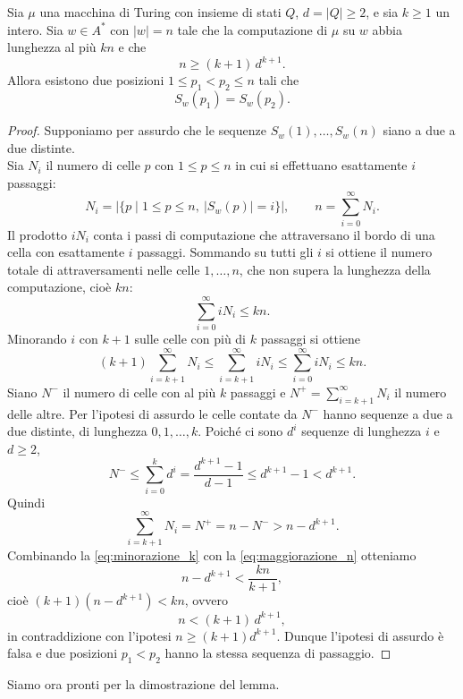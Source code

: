 \begin{lemm}\label{lemm:ripetizione}
Sia $\mu$ una macchina di Turing con insieme di stati $Q$, $d = |Q| \ge 2$, e sia $k \ge 1$ un intero. Sia $w \in A^*$ con $|w| = n$ tale che la computazione di $\mu$ su $w$ abbia lunghezza al più $kn$ e che
\[
n \ge (k+1)\,d^{k+1}.
\]
Allora esistono due posizioni $1 \le p_1 < p_2 \le n$ tali che
\[
S_w(p_1) = S_w(p_2).
\]
\begin{proof}
Supponiamo per assurdo che le sequenze $S_w(1), \dots, S_w(n)$ siano a due a due distinte.
\\
Sia $N_i$ il numero di celle $p$ con $1 \le p \le n$ in cui si effettuano esattamente $i$ passaggi:
\[
N_i = |\{p \mid 1 \le p \le n,\ |S_w(p)| = i\}|,
\qquad n = \sum_{i=0}^{\infty} N_i.
\]
Il prodotto $iN_i$ conta i passi di computazione che attraversano il bordo di una cella con esattamente $i$ passaggi. Sommando su tutti gli $i$ si ottiene il numero totale di attraversamenti nelle celle $1,\dots,n$, che non supera la lunghezza della computazione, cioè $kn$:
\[
\sum_{i=0}^{\infty} iN_i \le kn.
\]
Minorando $i$ con $k+1$ sulle celle con più di $k$ passaggi si ottiene
\begin{equation}\label{eq:minorazione_k}
(k+1)\sum_{i=k+1}^{\infty} N_i \le \sum_{i=k+1}^{\infty} iN_i \le \sum_{i=0}^{\infty} iN_i \le kn.
\end{equation}
Siano $N^-$ il numero di celle con al più $k$ passaggi e $N^+ = \sum_{i=k+1}^{\infty} N_i$ il numero delle altre. Per l'ipotesi di assurdo le celle contate da $N^-$ hanno sequenze a due a due distinte, di lunghezza $0,1,\dots,k$. Poiché ci sono $d^i$ sequenze di lunghezza $i$ e $d \ge 2$,
\[
N^- \le \sum_{i=0}^{k} d^i = \frac{d^{k+1}-1}{d-1} \le d^{k+1}-1 < d^{k+1}.
\]
Quindi
\begin{equation}\label{eq:maggiorazione_n}
\sum_{i=k+1}^{\infty} N_i = N^+ = n - N^- > n - d^{k+1}.
\end{equation}
Combinando la \eqref{eq:minorazione_k} con la \eqref{eq:maggiorazione_n} otteniamo
\[
n - d^{k+1} < \frac{kn}{k+1},
\]
cioè $(k+1)(n - d^{k+1}) < kn$, ovvero
\[
n < (k+1)\,d^{k+1},
\]
in contraddizione con l'ipotesi $n \ge (k+1)d^{k+1}$. Dunque l'ipotesi di assurdo è falsa e due posizioni $p_1 < p_2$ hanno la stessa sequenza di passaggio.
\end{proof}
\end{lemm}
Siamo ora pronti per la dimostrazione del lemma.
